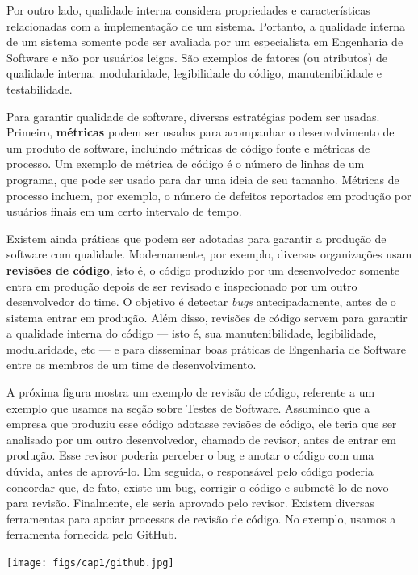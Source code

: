 \documentclass[
  11pt,
  twoside]{book}
\let\origfigure\figure
\let\endorigfigure\endfigure
\renewenvironment{figure}[1][2] {
    \expandafter\origfigure\expandafter[!h]
} {
    \endorigfigure
}
\begin{document}
 Por outro lado, qualidade interna
considera propriedades e características relacionadas com a
implementação de um sistema. Portanto, a qualidade interna de um sistema
somente pode ser avaliada por um especialista em Engenharia de Software
e não por usuários leigos. São exemplos de fatores (ou atributos) de
qualidade interna: modularidade, legibilidade do código,
manutenibilidade e testabilidade.

Para garantir qualidade de software, diversas estratégias podem ser
usadas. Primeiro, \textbf{métricas} podem ser usadas para acompanhar o
desenvolvimento de um produto de software, incluindo métricas de código
fonte e métricas de processo. Um exemplo de métrica de código é o número
de linhas de um programa, que pode ser usado para dar uma ideia de seu
tamanho. Métricas de processo incluem, por exemplo, o número de defeitos
reportados em produção por usuários finais em um certo intervalo de
tempo.

 Existem ainda práticas que podem ser adotadas
para garantir a produção de software com qualidade. Modernamente, por
exemplo, diversas organizações usam \textbf{revisões de código}, isto é,
o código produzido por um desenvolvedor somente entra em produção depois
de ser revisado e inspecionado por um outro desenvolvedor do time. O
objetivo é detectar \emph{bugs} antecipadamente, antes de o sistema
entrar em produção. Além disso, revisões de código servem para garantir
a qualidade interna do código --- isto é, sua manutenibilidade,
legibilidade, modularidade, etc --- e para disseminar boas práticas de
Engenharia de Software entre os membros de um time de desenvolvimento.

A próxima figura mostra um exemplo de revisão de código, referente a um
exemplo que usamos na seção sobre Testes de Software. Assumindo que a
empresa que produziu esse código adotasse revisões de código, ele teria
que ser analisado por um outro desenvolvedor, chamado de revisor, antes
de entrar em produção. Esse revisor poderia perceber o bug e anotar o
código com uma dúvida, antes de aprová-lo. Em seguida, o responsável
pelo código poderia concordar que, de fato, existe um bug, corrigir o
código e submetê-lo de novo para revisão. Finalmente, ele seria aprovado
pelo revisor. Existem diversas ferramentas para apoiar processos de
revisão de código. No exemplo, usamos a ferramenta fornecida pelo
GitHub.

\begin{figure}
\centering
\texttt{[image: figs/cap1/github.jpg]}
\caption{Exemplo de revisão de código}
\end{figure}
\end{document}
